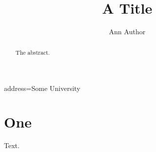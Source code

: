 \documentclass{aipproc}
\begin{document}
\title{A Title}
\author{Ann Author}{address={Some University}}
\begin{abstract}The abstract.\end{abstract}
\maketitle
\section{One}
\SetInternalRegister{}
Text.
\end{document}
